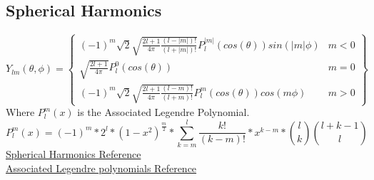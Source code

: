 \documentclass[10pt]{extarticle}
\begin{document}
\subsection{Spherical Harmonics}
\[
Y_{lm} (\theta,\phi) = 
\begin{Bmatrix}
(-1)^m\sqrt{2}\sqrt{\frac{2l+1}{4\pi}\frac{(l-|m|)!}{(l+|m|)!}}P_l^{|m|}(cos(\theta)) sin(|m|\phi) & m < 0 \\
\sqrt{\frac{2l+1}{4\pi}}P_l^{0}(cos(\theta)) & m = 0 \\
(-1)^m\sqrt{2}\sqrt{\frac{2l+1}{4\pi}\frac{(l-m)!}{(l+m)!}}P_l^{m}(cos(\theta)) cos(m\phi) & m > 0 
\end{Bmatrix}
\]
Where $P_l^m(x)$ is the Associated Legendre Polynomial. \\ 
$$P_l^m(x) = (-1)^m*2^l*(1-x^2)^{\frac{m}{2}}*\sum_{k=m}^l\frac{k!}{(k-m)!}*x^{k-m}* \binom{l}{k}\binom{l+k-1}{l}$$
\href{https://en.wikipedia.org/wiki/Spherical_harmonics}{Spherical Harmonics Reference} \\ 
\href{https://en.wikipedia.org/wiki/Associated_Legendre_polynomials}{Associated Legendre polynomials Reference} \\ 
\end{document}
